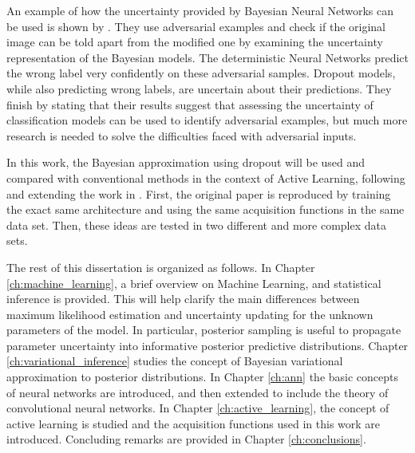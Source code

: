 An example of how the uncertainty provided by Bayesian Neural Networks can be used is shown by \citeauthor{li2017dropout} \cite{li2017dropout}. They use adversarial examples and check if the original image can be told apart from the modified one by examining the uncertainty representation of the Bayesian models. The deterministic Neural Networks predict the wrong label very confidently on these adversarial samples. Dropout models, while also predicting wrong labels, are uncertain about their predictions. They finish by stating that their results suggest that assessing the uncertainty of classification models can be used to identify adversarial examples, but much more research is needed to solve the difficulties faced with adversarial inputs.


In this work, the Bayesian approximation using dropout will be used and compared with conventional methods in the context of Active Learning, following and extending the work in \cite{Gal2016Active}. First, the original paper is reproduced by training the exact same architecture and using the same acquisition functions in the same data set. Then, these ideas are tested in two different and more complex data sets.

The rest of this dissertation is organized as follows. In Chapter \ref{ch:machine_learning}, a brief overview on Machine Learning, and statistical inference is provided. This will help clarify the main differences between maximum likelihood estimation and uncertainty updating for the unknown parameters of the model. In particular, posterior sampling is useful to propagate parameter uncertainty into informative posterior predictive distributions. Chapter \ref{ch:variational_inference} studies the concept of Bayesian variational approximation to posterior distributions. In Chapter \ref{ch:ann} the basic concepts of neural networks are introduced, and then extended to include the theory of convolutional neural networks. In Chapter \ref{ch:active_learning}, the concept of active learning is studied and the acquisition functions used in this work are introduced. Concluding remarks are provided in Chapter \ref{ch:conclusions}.
